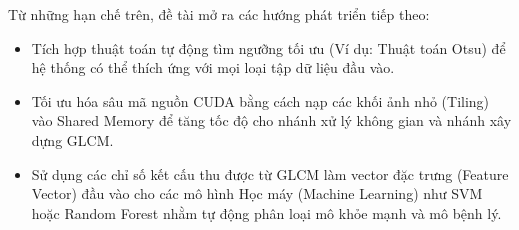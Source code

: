 Từ những hạn chế trên, đề tài mở ra các hướng phát triển tiếp theo:

\begin{itemize}
    \item Tích hợp thuật toán tự động tìm ngưỡng tối ưu (Ví dụ: Thuật toán Otsu) để hệ thống có thể thích ứng với mọi loại tập dữ liệu đầu vào.
    
    \item Tối ưu hóa sâu mã nguồn CUDA bằng cách nạp các khối ảnh nhỏ (Tiling) vào Shared Memory để tăng tốc độ cho nhánh xử lý không gian và nhánh xây dựng GLCM.
    
    \item Sử dụng các chỉ số kết cấu thu được từ GLCM làm vector đặc trưng (Feature Vector) đầu vào cho các mô hình Học máy (Machine Learning) như SVM hoặc Random Forest nhằm tự động phân loại mô khỏe mạnh và mô bệnh lý.
\end{itemize}

